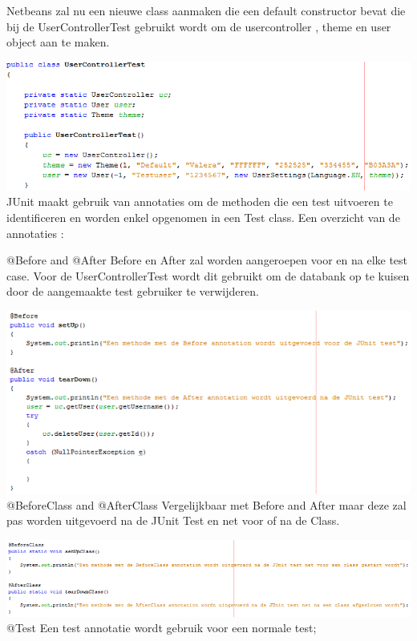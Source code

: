 \documentclass[pdftex,a4paper,12pt,twoside]{report}
\begin{document}
Netbeans zal nu een nieuwe class aanmaken die een default constructor bevat die bij de UserControllerTest gebruikt wordt om de usercontroller , theme en user object aan te maken.

\includegraphics{images/junit1.png}\\

JUnit maakt gebruik van annotaties om de methoden die een test uitvoeren te identificeren en worden enkel opgenomen in een Test class. 
Een overzicht van de annotaties :

@Before and @After
Before en After zal worden aangeroepen voor en na elke test case.
Voor de UserControllerTest wordt dit gebruikt om de databank op te kuisen door de aangemaakte test gebruiker te verwijderen.

\includegraphics{images/beforeafter.png}\\


@BeforeClass and @AfterClass
Vergelijkbaar met Before and After maar deze zal pas worden uitgevoerd na de JUnit Test en net voor of na de Class.

\includegraphics{images/beforeafterclass.png}\\

@Test
Een test annotatie wordt gebruik voor een normale test;
\end{document}
